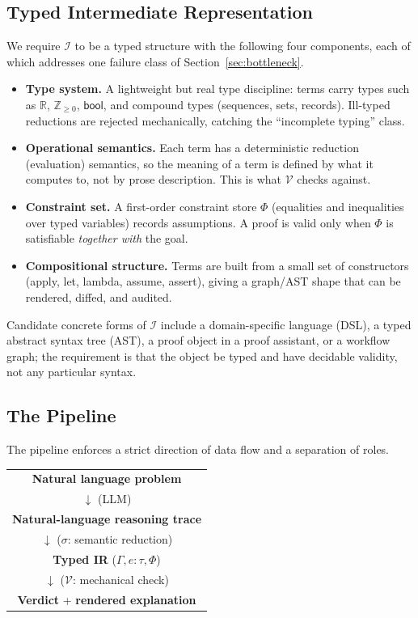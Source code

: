 \documentclass[11pt]{article}
\newcommand{\IR}{\mathcal{I}}
\newcommand{\VV}{\mathcal{V}}
\begin{document}
\subsection{Typed Intermediate Representation}
We require $\IR$ to be a typed structure with the following four components, each of which addresses one failure class of Section~\ref{sec:bottleneck}.

\begin{itemize}
\item \textbf{Type system.} A lightweight but real type discipline: terms carry types such as $\mathbb{R}$, $\mathbb{Z}_{\ge 0}$, $\mathsf{bool}$, and compound types (sequences, sets, records). Ill-typed reductions are rejected mechanically, catching the ``incomplete typing'' class.
\item \textbf{Operational semantics.} Each term has a deterministic reduction (evaluation) semantics, so the meaning of a term is defined by what it computes to, not by prose description. This is what $\VV$ checks against.
\item \textbf{Constraint set.} A first-order constraint store $\Phi$ (equalities and inequalities over typed variables) records assumptions. A proof is valid only when $\Phi$ is satisfiable \emph{together with} the goal.
\item \textbf{Compositional structure.} Terms are built from a small set of constructors (apply, let, lambda, assume, assert), giving a graph/AST shape that can be rendered, diffed, and audited.
\end{itemize}

Candidate concrete forms of $\IR$ include a domain-specific language (DSL), a typed abstract syntax tree (AST), a proof object in a proof assistant, or a workflow graph; the requirement is that the object be typed and have decidable validity, not any particular syntax.

\subsection{The Pipeline}
The pipeline enforces a strict direction of data flow and a separation of roles.

\begin{center}
\small
\begin{tabular}{c}
\textbf{Natural language problem} \\
$\downarrow$ \quad (LLM) \\
\textbf{Natural-language reasoning trace} \\
$\downarrow$ \quad ($\sigma$: semantic reduction) \\
\textbf{Typed IR} \quad ($\Gamma, e:\tau, \Phi$) \\
$\downarrow$ \quad ($\VV$: mechanical check) \\
\textbf{Verdict} + \textbf{rendered explanation}
\end{tabular}
\end{center}
\end{document}
